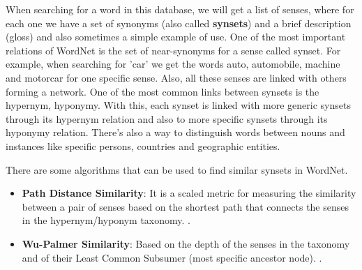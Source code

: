 When searching for a word in this database, we will get a list of senses, where for each one we have a set of synonyms (also called \textbf{synsets}) and a brief description (gloss) and also sometimes a simple example of use. One of the most important relations of WordNet is the set of near-synonyms for a sense called synset. For example, when searching for 'car' we get the words auto, automobile, machine and motorcar for one specific sense. Also, all these senses are linked with others forming a network. One of the most common links between synsets is the hypernym, hyponymy. With this, each synset is linked with more generic synsets through its hypernym relation and also to more specific synsets through its hyponymy relation. There's also a way to distinguish words between nouns and instances like specific persons, countries and geographic entities.

There are some algorithms that can be used to find similar synsets in WordNet.

\begin{itemize}
    \item \textbf{Path Distance Similarity}: It is a scaled metric for measuring the similarity between a pair of senses based on the shortest path that connects the senses in the hypernym/hyponym taxonomy. \cite{meng2014measuring}.
    \item \textbf{Wu-Palmer Similarity}: Based on the depth of the senses in the taxonomy and of their Least Common Subsumer (most specific ancestor node). \cite{meng2014measuring}.
\end{itemize}


